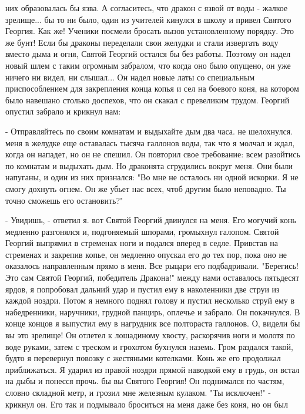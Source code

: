 них образовалась бы язва. А согласитесь, что дракон с язвой от воды - 
жалкое зрелище...
 бы то ни было, один из учителей кинулся в школу и привел 
Святого Георгия. Как же! Ученики посмели бросать вызов установленному 
порядку. Это же бунт! Если бы драконы переделали свои желудки и стали 
извергать воду вместо дыма и огня, Святой Георгий остался бы без 
работы. Поэтому он надел новый шлем с таким огромным забралом, что 
когда оно было опущено, он уже ничего ни видел, ни слышал... Он надел 
новые латы со специальным приспособлением для закрепления конца копья 
и сел на боевого коня, на котором было навешано столько доспехов, что 
он скакал с превеликим трудом.
 Георгий опустил забрало и крикнул нам:
\par- Отправляйтесь по своим комнатам и выдыхайте дым два часа.
 не шелохнулся.
 меня в желудке еще оставалась тысяча галлонов воды, так что я 
молчал и ждал, когда он нападет, но он не спешил. Он повторил свое 
требование: всем разойтись по комнатам и выдыхать дым. Но драконята 
сгрудились вокруг меня. Они были напуганы, и один из них признался: 
"Во мне не осталось ни одной искорки. Я не смогу дохнуть огнем. Он же 
убьет нас всех, чтоб другим было неповадно. Ты точно сможешь его 
остановить?"
\par- Увидишь, - ответил я.
 вот Святой Георгий двинулся на меня. Его могучий конь медленно 
разгонялся и, подгоняемый шпорами, громыхнул галопом. Святой Георгий 
выпрямил в стременах ноги и подался вперед в седле. Привстав на 
стременах и закрепив копье, он медленно опускал его до тех пор, пока 
оно не оказалось направленным прямо в меня. Все рыцари его 
подбадривали. "Берегись! Это сам Святой Георгий, победитель Дракона!"
 между нами оставалось пятьдесят ярдов, я попробовал дальний 
удар и пустил ему в наколенники две струи из каждой ноздри. Потом я 
немного поднял голову и пустил несколько струй ему в набедренники, 
наручники, грудной панцирь, оплечье и забрало. Он покачнулся. В конце 
концов я выпустил ему в нагрудник все полтораста галлонов. О, видели 
бы вы это зрелище! Он отлетел к лошадиному хвосту, раскорячив ноги и 
молотя по воде руками, затем с треском и грохотом бухнулся наземь. 
Гром раздался такой, будто я перевернул повозку с жестяными котелками. 
Конь же его продолжал приближаться. Я ударил из правой ноздри прямой 
наводкой ему в грудь, он встал на дыбы и понесся прочь.
 бы вы Святого Георгия! Он поднимался по частям, словно 
складной метр, и грозил мне железным кулаком. "Ты исключен!" - крикнул 
он. Его так и подмывало броситься на меня даже без коня, но он был 
